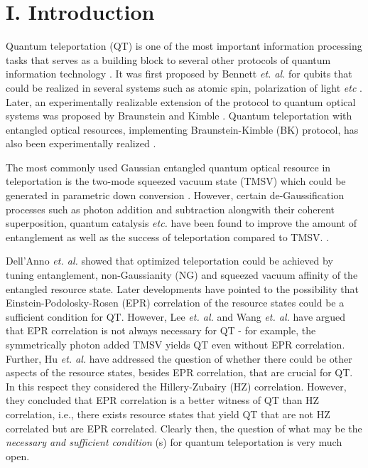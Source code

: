 \documentclass[letter,scriptaddress,twocolumn, prl,showkeys]{revtex4}
\begin{document}
\maketitle
\section*{I. Introduction}

Quantum teleportation (QT) \cite{book_qit} is one of the most important information processing tasks that serves as a building block to several other protocols of quantum information technology \cite{qt_tp}.
It was first proposed by Bennett \emph{et. al.} \cite{TP_B} for qubits that could be realized in several systems such as atomic spin, polarization of light \emph{etc} \cite{book_qit}. 
Later, an experimentally realizable extension of the protocol to quantum optical systems was proposed by Braunstein and Kimble \cite{TP_BK}. 
Quantum teleportation with entangled optical resources, implementing Braunstein-Kimble (BK) protocol, has also been experimentally realized \cite{tp_exp1,tp_exp2,tp_exp3,tp_exp4,tp_exp5}. 

The most commonly used Gaussian entangled quantum optical resource in teleportation is the two-mode squeezed vacuum state (TMSV) which could be generated in parametric down conversion \cite{OPDC}.
However, certain de-Gaussification processes such as photon addition and subtraction  alongwith their coherent superposition, quantum catalysis \emph{etc.} have been found to improve the amount of entanglement as well as the success of teleportation compared to TMSV. \cite{ent_grangier,tp_illuminati,tp_yang,tp_lee,ent_benlloch,tp_wang, tp_agarwal,tp_zubairy}.

Dell'Anno \emph{et. al.} \cite{tp_illuminati} showed that optimized teleportation could be achieved by tuning entanglement, non-Gaussianity (NG) and squeezed vacuum affinity of the entangled resource state. 
Later developments \cite{tp_yang,tp_lee,tp_wang,tp_agarwal} have pointed to the possibility that Einstein-Podolosky-Rosen (EPR) correlation of the resource states could be a sufficient condition for QT. 
However, Lee \emph{et. al.} \cite{tp_lee} and Wang \emph{et. al.} \cite{tp_wang} have argued that EPR correlation is not always necessary for QT - for example, the symmetrically photon added TMSV yields QT even without EPR correlation.
Further, Hu \emph{et. al.} \cite{tp_zubairy} have addressed the question of whether there could be other aspects of the resource states, besides EPR correlation, that are crucial for QT. 
In this respect they considered the Hillery-Zubairy (HZ) correlation. However, they concluded that EPR correlation is a better witness of QT than HZ correlation, i.e., there exists resource states that yield QT that are not HZ correlated but are EPR correlated.
Clearly then, the question of what may be the \emph{necessary and sufficient condition} (s) for quantum teleportation is very much open.
\end{document}
